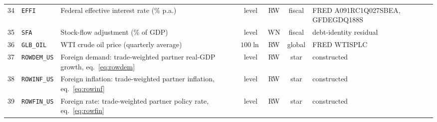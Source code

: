 \documentclass[11pt]{article}
\begin{document}
\begin{small}
\begin{longtable}{r l p{5.9cm} c c c p{3.4cm}}
34 & \texttt{EFFI} & Federal effective interest rate (\% p.a.) & level & RW & fiscal & FRED A091RC1Q027SBEA, GFDEGDQ188S \\
35 & \texttt{SFA} & Stock-flow adjustment (\% of GDP) & level & WN & fiscal & debt-identity residual \\
36 & \texttt{GLB\_OIL} & WTI crude oil price (quarterly average) & $100\ln$ & RW & global & FRED WTISPLC \\
37 & \texttt{ROWDEM\_US} & Foreign demand: trade-weighted partner real-GDP growth, eq.~\eqref{eq:rowdem} & level & RW & star & constructed \\
38 & \texttt{ROWINF\_US} & Foreign inflation: trade-weighted partner inflation, eq.~\eqref{eq:rowinf} & level & RW & star & constructed \\
39 & \texttt{ROWFIN\_US} & Foreign rate: trade-weighted partner policy rate, eq.~\eqref{eq:rowfin} & level & RW & star & constructed \\
\end{longtable}
\end{small}



\end{document}
